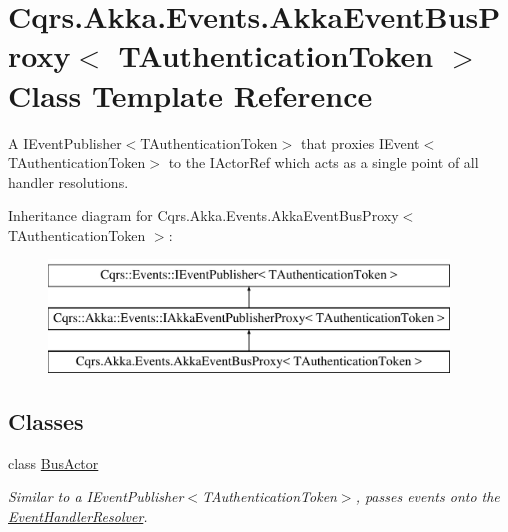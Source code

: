 \hypertarget{classCqrs_1_1Akka_1_1Events_1_1AkkaEventBusProxy}{}\section{Cqrs.\+Akka.\+Events.\+Akka\+Event\+Bus\+Proxy$<$ T\+Authentication\+Token $>$ Class Template Reference}
\label{classCqrs_1_1Akka_1_1Events_1_1AkkaEventBusProxy}


A I\+Event\+Publisher$<$\+T\+Authentication\+Token$>$ that proxies I\+Event$<$\+T\+Authentication\+Token$>$ to the I\+Actor\+Ref which acts as a single point of all handler resolutions.  


Inheritance diagram for Cqrs.\+Akka.\+Events.\+Akka\+Event\+Bus\+Proxy$<$ T\+Authentication\+Token $>$\+:\begin{figure}[H]
\begin{center}
\leavevmode
\includegraphics[height=3.000000cm]{classCqrs_1_1Akka_1_1Events_1_1AkkaEventBusProxy}
\end{center}
\end{figure}
\subsection*{Classes}
\begin{DoxyCompactItemize}
\item 
class \hyperlink{classCqrs_1_1Akka_1_1Events_1_1AkkaEventBusProxy_1_1BusActor}{Bus\+Actor}
\begin{DoxyCompactList}\small\item\em Similar to a I\+Event\+Publisher$<$\+T\+Authentication\+Token$>$, passes events onto the \hyperlink{classCqrs_1_1Akka_1_1Events_1_1AkkaEventBusProxy_1_1BusActor_ae7986841b1bb97368936c52655b72f96_ae7986841b1bb97368936c52655b72f96}{Event\+Handler\+Resolver}. \end{DoxyCompactList}\end{DoxyCompactItemize}
